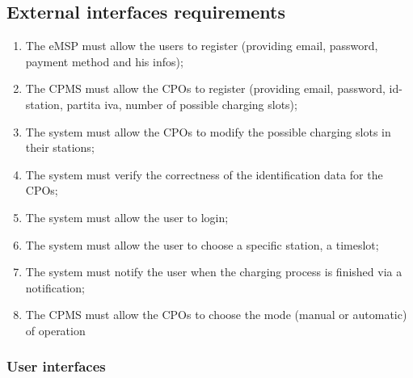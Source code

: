 \subsection{External interfaces requirements}
\begin{enumerate}[label=\textbf{R\arabic*}]
    \item The \ac{eMSP} must allow the users to register (providing email, password, payment method and his infos);
    \item The \ac{CPMS} must allow the \acp{CPO} to register (providing email, password, id-station, partita iva, number of possible charging slots);
    \item The system must allow the \acp{CPO} to modify the possible charging slots in their stations;
    \item The system must verify the correctness of the identification data for the \acp{CPO};
    \item The system must allow the user to login;
    \item The system must allow the user to choose a specific station, a timeslot;
    \item The system must notify the user when the charging process is finished via a notification;
    \item The \ac{CPMS} must allow the \acp{CPO} to choose the mode (manual or automatic) of operation
\end{enumerate}

\subsubsection{User interfaces}
